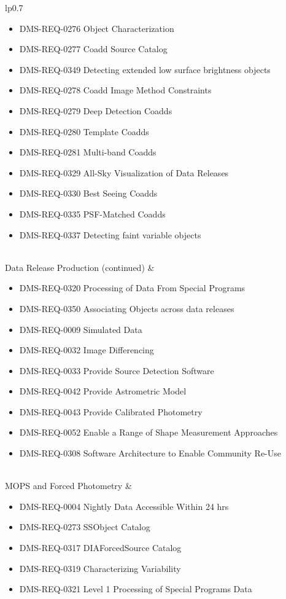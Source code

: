 \begin{xtabular}{lp{0.7\textwidth}}
\begin{itemize}
\item DMS-REQ-0276 Object Characterization
\item DMS-REQ-0277 Coadd Source Catalog
\item DMS-REQ-0349 Detecting extended low surface brightness objects
\item DMS-REQ-0278 Coadd Image Method Constraints
\item DMS-REQ-0279 Deep Detection Coadds
\item DMS-REQ-0280 Template Coadds
\item DMS-REQ-0281 Multi-band Coadds
\item DMS-REQ-0329 All-Sky Visualization of Data Releases
\item DMS-REQ-0330 Best Seeing Coadds
\item DMS-REQ-0335 PSF-Matched Coadds
\item DMS-REQ-0337 Detecting faint variable objects
\end{itemize} \\ \hline
Data Release Production (continued) &
\begin{itemize}
\item DMS-REQ-0320 Processing of Data From Special Programs
\item DMS-REQ-0350 Associating Objects across data releases
\item DMS-REQ-0009 Simulated Data
\item DMS-REQ-0032 Image Differencing
\item DMS-REQ-0033 Provide Source Detection Software
\item DMS-REQ-0042 Provide Astrometric Model
\item DMS-REQ-0043 Provide Calibrated Photometry
\item DMS-REQ-0052 Enable a Range of Shape Measurement Approaches
\item DMS-REQ-0308 Software Architecture to Enable Community Re-Use
\end{itemize} \\ \hline
MOPS and Forced Photometry &
\begin{itemize}
\item DMS-REQ-0004 Nightly Data Accessible Within 24 hrs
\item DMS-REQ-0273 SSObject Catalog
\item DMS-REQ-0317 DIAForcedSource Catalog
\item DMS-REQ-0319 Characterizing Variability
\item DMS-REQ-0321 Level 1 Processing of Special Programs Data

\end{itemize}
\end{xtabular}
